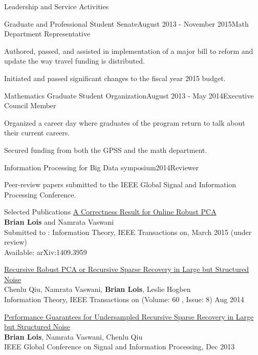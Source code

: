 \documentclass{resume} %
\begin{document}
\begin{rSection}{Leadership and Service Activities}

\begin{rSubsection}{Graduate and Professional Student Senate}{August 2013 - November 2015}{Math Department Representative}{  }
\item Authored, passed, and assisted in implementation of a major bill to reform and update the way travel funding is distributed.
\item Initiated and passed significant changes to the fiscal year 2015 budget.
\end{rSubsection}

\begin{rSubsection}{Mathematics Graduate Student Organization}{August 2013 - May 2014}{Executive Council Member}{ }
\item Organized a career day where graduates of the program return to talk about their current careers.
\item Secured funding from both the GPSS and the math department. 
\end{rSubsection}

\begin{rSubsection}{Information Processing for Big Data symposium}{2014}{Reviewer}{}
\item Peer-review papers submitted to the IEEE Global Signal and Information Processing Conference.
\end{rSubsection}

\end{rSection}

\begin{rSection}{Selected Publications}
\underline{A Correctness Result for Online Robust PCA}\\
{\bf Brian Lois} and Namrata Vaswani\\
Submitted to : Information Theory, IEEE Transactions on, March 2015 (under review)\\
Available: arXiv:1409.3959


\underline{Recursive Robust PCA or Recursive Sparse Recovery in Large but Structured Noise}\\
Chenlu Qiu, Namrata Vaswani, {\bf Brian Lois}, Leslie Hogben\\
Information Theory, IEEE Transactions on (Volume: 60 , Issue: 8) Aug 2014

\underline{Performance Guarantees for Undersampled Recursive Sparse Recovery in Large but Structured Noise} \\
{\bf Brian Lois}, Namrata Vaswani, Chenlu Qiu \\
IEEE Global Conference on Signal and Information Processing, Dec 2013
\end{rSection}





\end{document}
